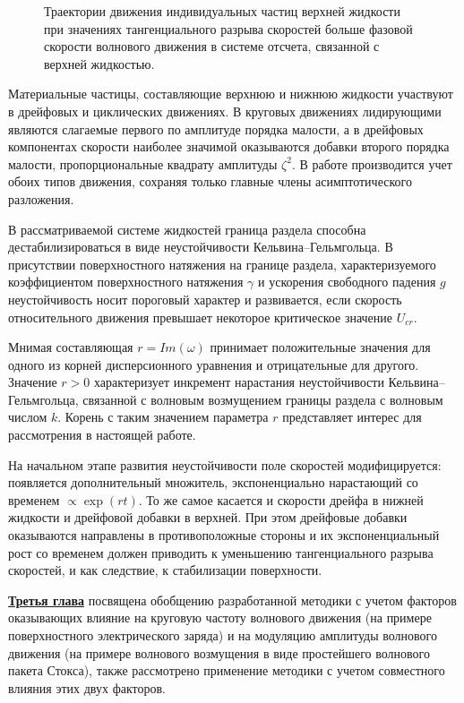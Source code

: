 \begin{figure}[ht]
	\caption{Траектории движения индивидуальных частиц верхней жидкости при значениях тангенциального разрыва скоростей больше фазовой скорости волнового движения в системе отсчета, связанной с верхней жидкостью.}
	\label{ris:Fig4}
\end{figure}

Материальные частицы, составляющие верхнюю и нижнюю жидкости участвуют в дрейфовых и циклических движениях. В круговых движениях лидирующими являются слагаемые первого по амплитуде порядка малости, а в дрейфовых компонентах скорости наиболее значимой оказываются добавки второго порядка малости, пропорциональные квадрату амплитуды $ \zeta^{2} $. В работе производится учет обоих типов движения, сохраняя только главные члены асимптотического разложения.

В рассматриваемой системе жидкостей граница раздела способна дестабилизироваться в виде неустойчивости Кельвина--Гельмгольца. В присутствии поверхностного натяжения на границе раздела, характеризуемого коэффициентом поверхностного натяжения $ \gamma $ и ускорения свободного падения $ g $ неустойчивость носит пороговый характер  и развивается, если скорость относительного движения превышает некоторое критическое значение $ U_{cr} $.

Мнимая составляющая $ r=Im\left(\omega\right) $ принимает положительные значения для одного из корней дисперсионного уравнения и отрицательные для другого. Значение $ r>0 $  характеризует инкремент нарастания неустойчивости Кельвина--Гельмгольца, связанной с волновым возмущением границы раздела с волновым числом $ k $. Корень с таким значением параметра $ r $ представляет интерес для рассмотрения в настоящей работе.

На начальном этапе развития неустойчивости поле скоростей модифицируется: появляется дополнительный множитель, экспоненциально нарастающий со временем $ \propto \exp \left( r t\right) $. То же самое касается и скорости дрейфа в нижней жидкости и дрейфовой добавки в верхней. При этом дрейфовые добавки оказываются направлены в противоположные стороны и их экспоненциальный рост со временем должен приводить к уменьшению тангенциального разрыва скоростей, и как следствие, к стабилизации поверхности.

\underline{\textbf{Третья глава}} посвящена обобщению разработанной методики с учетом факторов оказывающих влияние на круговую частоту волнового движения (на примере поверхностного электрического заряда) и на модуляцию амплитуды волнового движения (на примере волнового возмущения в виде простейшего волнового пакета Стокса), также рассмотрено применение методики с учетом совместного влияния этих двух факторов. 

